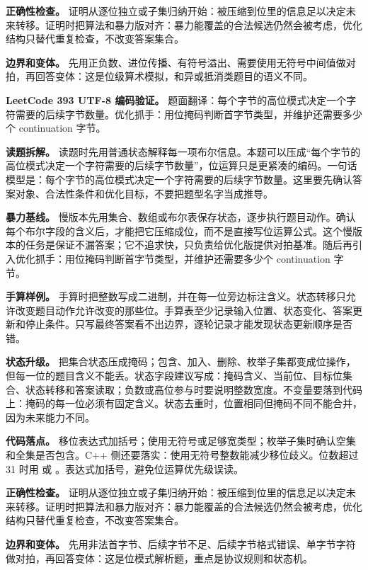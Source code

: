 \textbf{正确性检查。} 证明从逐位独立或子集归纳开始：被压缩到位里的信息足以决定未来转移。证明时把算法和暴力版对齐：暴力能覆盖的合法候选仍然会被考虑，优化结构只替代重复检查，不改变答案集合。

\textbf{边界和变体。} 先用正负数、进位传播、有符号溢出、需要使用无符号中间值做对拍，再回答变体：这是位级算术模拟，和异或抵消类题目的语义不同。

\noindent\textbf{LeetCode 393 UTF-8 编码验证。} 题面翻译：每个字节的高位模式决定一个字符需要的后续字节数量。优化抓手：用位掩码判断首字节类型，并维护还需要多少个 continuation 字节。

\textbf{读题拆解。} 读题时先用普通状态解释每一项布尔信息。本题可以压成“每个字节的高位模式决定一个字符需要的后续字节数量”，位运算只是更紧凑的编码。一句话模型是：每个字节的高位模式决定一个字符需要的后续字节数量。这里要先确认答案对象、合法性条件和优化目标，不要把题型名字当成推导。

\textbf{暴力基线。} 慢版本先用集合、数组或布尔表保存状态，逐步执行题目动作。确认每个布尔字段的含义后，才能把它压缩成位，而不是直接写位运算公式。这个慢版本的任务是保证不漏答案；它不追求快，只负责给优化版提供对拍基准。随后再引入优化抓手：用位掩码判断首字节类型，并维护还需要多少个 continuation 字节。

\textbf{手算样例。} 手算时把整数写成二进制，并在每一位旁边标注含义。状态转移只允许改变题目动作允许改变的那些位。手算表至少记录输入位置、状态变化、答案更新和停止条件。只写最终答案看不出边界，逐轮记录才能发现状态更新顺序是否错。

\textbf{状态升级。} 把集合状态压成掩码；包含、加入、删除、枚举子集都变成位操作，但每一位的题目含义不能丢。状态字段建议写成：掩码含义、当前位、目标位集合、状态转移和答案读取；负数或高位参与时要说明整数宽度。不变量要落到代码上：掩码的每一位必须有固定含义。状态去重时，位置相同但掩码不同不能合并，因为未来能力不同。

\textbf{代码落点。} 移位表达式加括号；使用无符号或足够宽类型；枚举子集时确认空集和全集是否包含。C++ 侧还要落实：使用无符号整数能减少移位歧义。位数超过 31 时用  或 。表达式加括号，避免位运算优先级误读。

\textbf{正确性检查。} 证明从逐位独立或子集归纳开始：被压缩到位里的信息足以决定未来转移。证明时把算法和暴力版对齐：暴力能覆盖的合法候选仍然会被考虑，优化结构只替代重复检查，不改变答案集合。

\textbf{边界和变体。} 先用非法首字节、后续字节不足、后续字节格式错误、单字节字符做对拍，再回答变体：这是位模式解析题，重点是协议规则和状态机。

